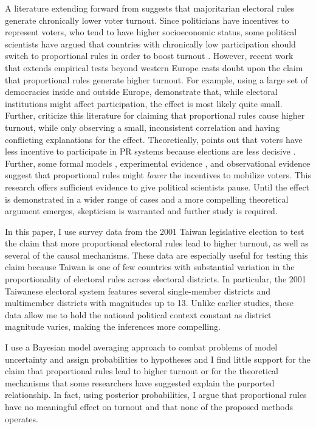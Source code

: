 \documentclass[12pt]{article}
\begin{document}
\doublespace
A literature extending forward from \cite{Powell1986} suggests that majoritarian electoral rules generate chronically lower voter turnout. Since politicians have incentives to represent voters, who tend to have higher socioeconomic status, some political scientists have argued that countries with chronically low participation should switch to proportional rules in order to boost turnout \citep{Lijphart1997, Lijphart1999}. However, recent work that extends empirical tests beyond western Europe casts doubt upon the claim that proportional rules generate higher turnout. For example, using a large set of democracies inside and outside Europe, \cite{BlaisDobrzynska1998} demonstrate that, while electoral institutions might affect participation, the effect is most likely quite small. Further, \cite{BlaisAarts2006} criticize this literature for claiming that proportional rules cause higher turnout, while only observing a small, inconsistent correlation and having conflicting explanations for the effect. Theoretically, \cite{Jackman1987} points out that voters have less incentive to participate in PR systems because elections are less decisive \citep{Powell2000}. Further, some formal models \citep{Rainey2015, HerreraMorelliPalfrey2013, SchramSonnemans1996}, experimental evidence \citep{HerreraMorelliPalfrey2013, SchramSonnemans1996}, and observational evidence \citep{Rainey2015, KarpBanducciBowler2007} suggest that proportional rules might \textit{lower} the incentives to mobilize voters. This research offers sufficient evidence to give political scientists pause. Until the effect is demonstrated in a wider range of cases and a more compelling theoretical argument emerges, skepticism is warranted and further study is required.

In this paper, I use survey data from the 2001 Taiwan legislative election to test the claim that more proportional electoral rules lead to higher turnout, as well as several of the causal mechanisms. These data are especially useful for testing this claim because Taiwan is one of few countries with substantial variation in the proportionality of electoral rules across electoral districts. In particular, the 2001 Taiwanese electoral system features several single-member districts and multimember districts with magnitudes up to 13. Unlike earlier studies, these data allow me to hold the national political context constant as district magnitude varies, making the inferences more compelling.

I use a Bayesian model averaging approach to combat problems of model uncertainty and assign probabilities to hypotheses \citep{MontgomeryNyhan2010} and I find little support for the claim that proportional rules lead to higher turnout or for the theoretical mechanisms that some researchers have suggested explain the purported relationship. In fact, using posterior probabilities, I argue that proportional rules have no meaningful effect on turnout and that none of the proposed methods operates.
\end{document}
